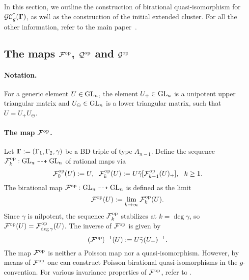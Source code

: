 In this section, we outline the construction of birational quasi-isomorphism for $\mathcal{GC}_g^{\dagger}(\mathbf{\Gamma})$, as well as the construction of the initial extended cluster. For all the other information, refer to the main paper~\cite{multdual}.

\subsection{The maps $\mathcal{F}^{\mathrm{op}}$, $\mathcal{Q}^{\mathrm{op}}$ and $\mathcal{G}^{\mathrm{op}}$}

\paragraph{Notation.} For a generic element $U \in \operatorname{GL}_n$, the element $U_+ \in \operatorname{GL}_n$ is a unipotent upper triangular matrix and $U_\ominus\in \operatorname{GL}_n$ is a lower triangular matrix, such that $U = U_+ U_\ominus$.

\paragraph{The map $\mathcal{F}^{\mathrm{op}}$.}  Let $\mathbf{\Gamma} := (\Gamma_1,\Gamma_2,\gamma)$ be a BD triple of type $A_{n-1}$. Define the sequence $\mathcal{F}_k^{\mathrm{op}}:\operatorname{GL}_n\dashrightarrow \operatorname{GL}_n$ of rational maps via
\begin{equation}
    \mathcal{F}_0^{\op}(U):= U, \ \ \mathcal{F}_k^{\op}(U):= U\tilde{\gamma}[\mathcal{F}_{k-1}^{\op}(U)_+], \ \ k \geq 1.
\end{equation}
The birational map $\mathcal{F}^{\mathrm{op}}:\operatorname{GL}_n \dashrightarrow \operatorname{GL}_n$ is defined as the limit 
\begin{equation}\label{eq:def_fop}
    \mathcal{F}^{\mathrm{op}}(U):= \lim_{k \rightarrow \infty} \mathcal{F}_k^{\mathrm{op}}(U).
\end{equation}
Since $\gamma$ is nilpotent, the sequence $\mathcal{F}_k^{\mathrm{op}}$ stabilizes at $k = \deg \gamma$, so $\mathcal{F}^{\mathrm{op}}(U) = \mathcal{F}_{\deg \gamma}^{\mathrm{op}}(U)$. The inverse of $\mathcal{F}^{\mathrm{op}}$ is given by
\begin{equation}
    (\mathcal{F}^{\mathrm{op}})^{-1}(U):= U\tilde{\gamma}(U_+)^{-1}.
\end{equation}
The map $\mathcal{F}^{\mathrm{op}}$ is neither a Poisson map nor a quasi-isomorphism. However, by means of $\mathcal{F}^{\mathrm{op}}$ one can construct Poisson birational quasi-isomorphisms in the $g$-convention. For various invariance properties of $\mathcal{F}^{\mathrm{op}}$, refer to \cite[Section 7.1]{multdual}.

